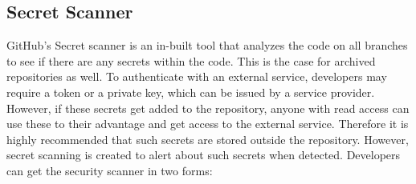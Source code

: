 \subsection{Secret Scanner}
GitHub's Secret scanner is an in-built tool that analyzes the code on all branches to see if there are any secrets within the code. This is the case for archived repositories as well. To authenticate with an external service, developers may require a token or a private key, which can be issued by a service provider. However, if these secrets get added to the repository, anyone with read access can use these to their advantage and get access to the external service. Therefore it is highly recommended that such secrets are stored outside the repository. However, secret scanning is created to alert about such secrets when detected. Developers can get the
security scanner in two forms\cite{GithubSecretScanning}: 
